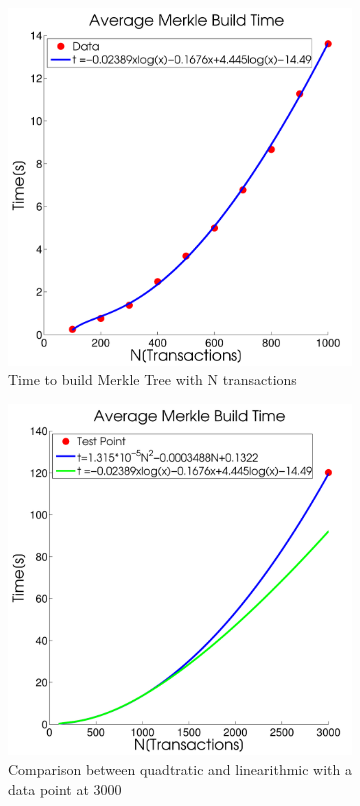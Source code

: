 \documentclass[pdftex,11pt]{article}
\begin{document}
\begin{figure}[H]
	\centering
	\begin{subfigure}[H]{0.4\textwidth}
		\includegraphics[width=\textwidth]{figures/MerkComp.pdf}
		\caption{Time to build Merkle Tree with N transactions}
	\end{subfigure}
	\begin{subfigure}[H]{0.4\textwidth}
		\includegraphics[width=\textwidth]{figures/Overtake.pdf}
		\caption{Comparison between quadtratic and linearithmic with a data point at 3000}
	\end{subfigure}
	\caption{}
	\label{fig:merk2}
\end{figure}
\end{document}
